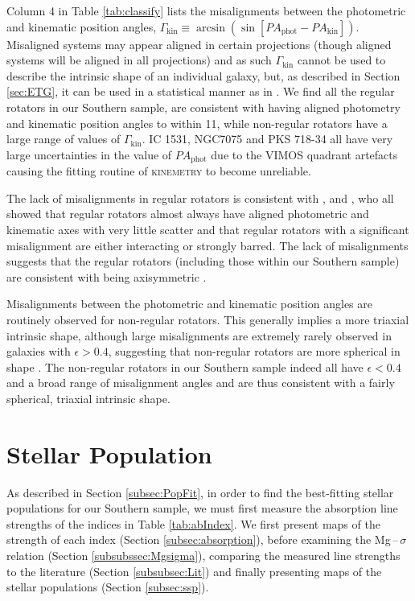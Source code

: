 			Column 4 in Table \ref{tab:classify} lists the misalignments between the photometric and kinematic position angles, $\Gamma_\text{kin} \equiv \arcsin(\sin[PA_\text{phot} - PA_\text{kin}])$. Misaligned systems may appear aligned in certain projections (though aligned systems will be aligned in all projections) and as such $\Gamma_\text{kin}$ cannot be used to describe the intrinsic shape of an individual galaxy, but, as described in Section \ref{sec:ETG}, it can be used in a statistical manner as in \citet{Cappellari2007}. We find all the regular rotators in our Southern sample, are consistent with having aligned photometry and kinematic position angles to within 11\degree, while non-regular rotators have a large range of values of $\Gamma_\text{kin}$. IC 1531, NGC7075 and PKS 718-34 all have very large uncertainties in the value of $PA_\text{phot}$ due to the VIMOS quadrant artefacts causing the fitting routine of \textsc{kinemetry} to become unreliable. 

			The lack of misalignments in regular rotators is consistent with \citet{Cappellari2007}, \citet{Krajnovic2011} and \citet{Fogarty2015}, who all showed that regular rotators almost always have aligned photometric and kinematic axes with very little scatter and that regular rotators with a significant misalignment are either interacting or strongly barred. The lack of misalignments suggests that the regular rotators (including those within our Southern sample) are consistent with being axisymmetric \citep{Cappellari2016}.

			Misalignments between the photometric and kinematic position angles are routinely observed for non-regular rotators. This generally implies a more triaxial intrinsic shape, although large misalignments are extremely rarely observed in galaxies with $\epsilon > 0.4$, suggesting that non-regular rotators are more spherical in shape \citep{Cappellari2016}. The non-regular rotators in our Southern sample indeed all have $\epsilon < 0.4$ and a broad range of misalignment angles and are thus consistent with a fairly spherical, triaxial intrinsic shape.


\section{Stellar Population}
	\label{sec:pop}
	As described in Section \ref{subsec:PopFit}, in order to find the best-fitting stellar populations for our Southern sample, we must first measure the absorption line strengths of the indices in Table \ref{tab:abIndex}. We first present maps of the strength of each index (Section \ref{subsec:absorption}), before examining the Mg\,--\,$\sigma$ relation (Section \ref{subsubssec:Mgsigma}), comparing the measured line strengths to the literature (Section \ref{subsubsec:Lit}) and finally presenting maps of the stellar populations (Section \ref{subsec:ssp}).

